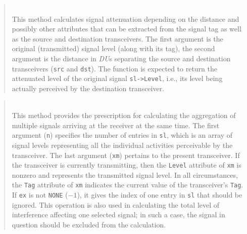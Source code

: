 \medskip

\begin{quote}
\noindent{} \hspace{0in}\vspace{0.05in}\\
\noindent
This method calculates signal attenuation depending on the distance and possibly
other attributes that can be extracted from the signal tag as well as the
source and destination transceivers.
The first argument is the original (transmitted) signal level (along with its
tag), the second
argument is the distance in {\em DU\/}s separating the source and destination
transceivers ({\tt src} and {\tt dst}).
The function is expected to return
the attenuated level of the original signal {\tt sl->Level},
i.e., its level being actually perceived by the destination transceiver.
\end{quote}

\begin{quote}
\noindent{} \hspace{0in}\vspace{0.05in}\\
\noindent
This method provides the prescription for calculating the aggregation of
multiple signals arriving at the receiver at the same time.
The first argument ({\tt n})
specifies the number of entries in {\tt sl}, which is
an array of signal levels representing all the individual
activities perceivable by the transceiver.
The last argument ({\tt xm}) pertains to the present transceiver.
If the transceiver is currently transmitting, then the {\tt Level} attribute
of {\tt xm} is nonzero and represents the transmitted signal level.
In all circumstances, the {\tt Tag} attribute of {\tt xm} indicates the current
value of the transceiver's {\tt Tag}.
If {\tt ex} is not {\tt NONE} ($-1$), it gives the index of one entry
in {\tt sl} that should be ignored.
This operation is also used in calculating the total level of interference
affecting one selected signal; in such a case, the signal in question should be
excluded from the calculation.
\end{quote}

